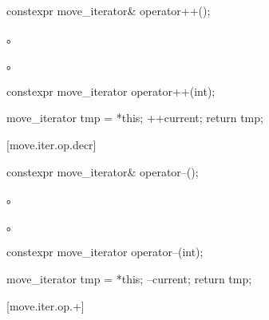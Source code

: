%
%
\begin{itemdecl}
constexpr move_iterator& operator++();
\end{itemdecl}

\begin{itemdescr}
\pnum
\effects {}。

\pnum
\returns {}。
\end{itemdescr}

%
%
\begin{itemdecl}
constexpr move_iterator operator++(int);
\end{itemdecl}

\begin{itemdescr}
\pnum
\effects
\begin{codeblock}
move_iterator tmp = *this;
++current;
return tmp;
\end{codeblock}
\end{itemdescr}

[move.iter.op.decr]{}

%
%
\begin{itemdecl}
constexpr move_iterator& operator--();
\end{itemdecl}

\begin{itemdescr}
\pnum
\effects {}。

\pnum
\returns {}。
\end{itemdescr}

%
%
\begin{itemdecl}
constexpr move_iterator operator--(int);
\end{itemdecl}

\begin{itemdescr}
\pnum
\effects
\begin{codeblock}
move_iterator tmp = *this;
--current;
return tmp;
\end{codeblock}
\end{itemdescr}

[move.iter.op.+]{}

